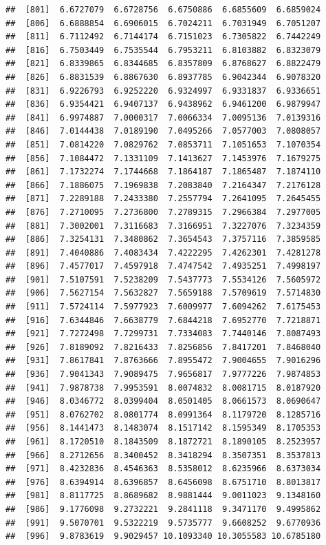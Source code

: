 \documentclass[
  11pt]{report}
\begin{document}
\begin{itemize}
\begin{verbatim}
##  [801]  6.6727079  6.6728756  6.6750886  6.6855609  6.6859024
##  [806]  6.6888854  6.6906015  6.7024211  6.7031949  6.7051207
##  [811]  6.7112492  6.7144174  6.7151023  6.7305822  6.7442249
##  [816]  6.7503449  6.7535544  6.7953211  6.8103882  6.8323079
##  [821]  6.8339865  6.8344685  6.8357809  6.8768627  6.8822479
##  [826]  6.8831539  6.8867630  6.8937785  6.9042344  6.9078320
##  [831]  6.9226793  6.9252220  6.9324997  6.9331837  6.9336651
##  [836]  6.9354421  6.9407137  6.9438962  6.9461200  6.9879947
##  [841]  6.9974887  7.0000317  7.0066334  7.0095136  7.0139316
##  [846]  7.0144438  7.0189190  7.0495266  7.0577003  7.0808057
##  [851]  7.0814220  7.0829762  7.0853711  7.1051653  7.1070354
##  [856]  7.1084472  7.1331109  7.1413627  7.1453976  7.1679275
##  [861]  7.1732274  7.1744668  7.1864187  7.1865487  7.1874110
##  [866]  7.1886075  7.1969838  7.2083840  7.2164347  7.2176128
##  [871]  7.2289188  7.2433380  7.2557794  7.2641095  7.2645455
##  [876]  7.2710095  7.2736800  7.2789315  7.2966384  7.2977005
##  [881]  7.3002001  7.3116683  7.3166951  7.3227076  7.3234359
##  [886]  7.3254131  7.3480862  7.3654543  7.3757116  7.3859585
##  [891]  7.4040886  7.4083434  7.4222295  7.4262301  7.4281278
##  [896]  7.4577017  7.4597918  7.4747542  7.4935251  7.4998197
##  [901]  7.5107591  7.5238209  7.5437773  7.5534126  7.5605972
##  [906]  7.5627154  7.5632827  7.5659188  7.5709619  7.5714830
##  [911]  7.5724114  7.5977923  7.6009977  7.6094262  7.6175453
##  [916]  7.6344846  7.6638779  7.6844218  7.6952770  7.7218871
##  [921]  7.7272498  7.7299731  7.7334083  7.7440146  7.8087493
##  [926]  7.8189092  7.8216433  7.8256856  7.8417201  7.8468040
##  [931]  7.8617841  7.8763666  7.8955472  7.9004655  7.9016296
##  [936]  7.9041343  7.9089475  7.9656817  7.9777226  7.9874853
##  [941]  7.9878738  7.9953591  8.0074832  8.0081715  8.0187920
##  [946]  8.0346772  8.0399404  8.0501405  8.0661573  8.0690647
##  [951]  8.0762702  8.0801774  8.0991364  8.1179720  8.1285716
##  [956]  8.1441473  8.1483074  8.1517142  8.1595349  8.1705353
##  [961]  8.1720510  8.1843509  8.1872721  8.1890105  8.2523957
##  [966]  8.2712656  8.3400452  8.3418294  8.3507351  8.3537813
##  [971]  8.4232836  8.4546363  8.5358012  8.6235966  8.6373034
##  [976]  8.6394914  8.6396857  8.6456098  8.6751710  8.8013817
##  [981]  8.8117725  8.8689682  8.9881444  9.0011023  9.1348160
##  [986]  9.1776098  9.2732221  9.2841118  9.3471170  9.4995862
##  [991]  9.5070701  9.5322219  9.5735777  9.6608252  9.6770936
##  [996]  9.8783619  9.9029457 10.1093340 10.3055583 10.6785180
\end{verbatim}


\end{itemize}
\end{document}
